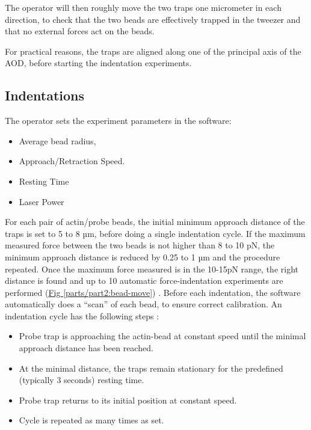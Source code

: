 \documentclass[A4paperpaper,11pt,english]{sphinxmanual}
\begin{document}
The operator will then roughly move the two traps one micrometer in each
direction, to check that the two beads are effectively trapped in the tweezer and
that no external forces act on the beads.

For practical reasons, the traps are aligned along one of the principal axis
of the AOD, before starting the indentation experiments.


\subsection{Indentations}
\label{parts/part2:indentations}
The operator sets the experiment parameters in the software:
\begin{itemize}
\item {} 
Average bead radius,

\item {} 
Approach/Retraction Speed.

\item {} 
Resting Time

\item {} 
Laser Power

\end{itemize}

For each pair of actin/probe beads, the initial minimum approach distance of the
traps is set to 5 to 8 µm, before doing a single indentation cycle. If the
maximum measured force between the two beads is not higher than 8 to 10 pN, the
minimum approach distance is reduced by 0.25 to 1 µm and the procedure
repeated. Once the maximum force measured is in the 10-15pN range, the right
distance is found and up to 10 automatic force-indentation experiments are
performed (\hyperref[parts/part2:bead-move]{Fig  \ref*{parts/part2:bead-move}}) . Before each indentation, the software automatically does a ``scan'' of
each bead, to ensure correct calibration. An indentation cycle has the
following steps :
\begin{itemize}
\item {} 
Probe trap is approaching the actin-bead at constant speed until the minimal approach distance has been reached.

\item {} 
At the minimal distance, the traps remain stationary for the predefined (typically 3 seconds) resting time.

\item {} 
Probe trap returns to its initial position at constant speed.

\item {} 
Cycle is repeated as many times as set.

\end{itemize}
\end{document}
